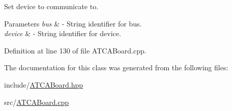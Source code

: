 Set device to communicate to. 


\begin{DoxyParams}{Parameters}
{\em bus} & -\/ String identifier for bus. \\
\hline
{\em device} & -\/ String identifier for device. \\
\hline
\end{DoxyParams}


Definition at line 130 of file A\+T\+C\+A\+Board.\+cpp.



The documentation for this class was generated from the following files\+:\begin{DoxyCompactItemize}
\item 
include/\hyperlink{_a_t_c_a_board_8hpp}{A\+T\+C\+A\+Board.\+hpp}\item 
src/\hyperlink{_a_t_c_a_board_8cpp}{A\+T\+C\+A\+Board.\+cpp}\end{DoxyCompactItemize}
